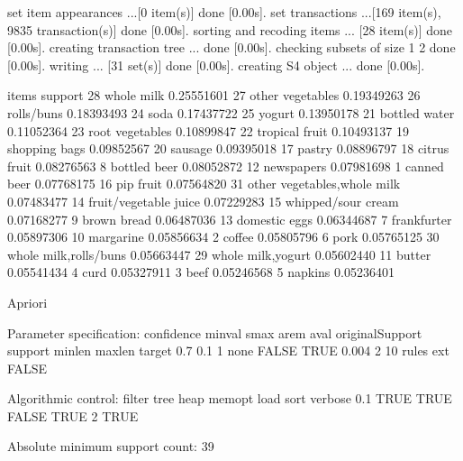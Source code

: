 \documentclass{scrartcl}
\begin{document}
\begin{Schunk}
\begin{Soutput}
set item appearances ...[0 item(s)] done [0.00s].
set transactions ...[169 item(s), 9835 transaction(s)] done [0.00s].
sorting and recoding items ... [28 item(s)] done [0.00s].
creating transaction tree ... done [0.00s].
checking subsets of size 1 2 done [0.00s].
writing ... [31 set(s)] done [0.00s].
creating S4 object  ... done [0.00s].
\end{Soutput}
\begin{Soutput}
   items                         support   
28 {whole milk}                  0.25551601
27 {other vegetables}            0.19349263
26 {rolls/buns}                  0.18393493
24 {soda}                        0.17437722
25 {yogurt}                      0.13950178
21 {bottled water}               0.11052364
23 {root vegetables}             0.10899847
22 {tropical fruit}              0.10493137
19 {shopping bags}               0.09852567
20 {sausage}                     0.09395018
17 {pastry}                      0.08896797
18 {citrus fruit}                0.08276563
8  {bottled beer}                0.08052872
12 {newspapers}                  0.07981698
1  {canned beer}                 0.07768175
16 {pip fruit}                   0.07564820
31 {other vegetables,whole milk} 0.07483477
14 {fruit/vegetable juice}       0.07229283
15 {whipped/sour cream}          0.07168277
9  {brown bread}                 0.06487036
13 {domestic eggs}               0.06344687
7  {frankfurter}                 0.05897306
10 {margarine}                   0.05856634
2  {coffee}                      0.05805796
6  {pork}                        0.05765125
30 {whole milk,rolls/buns}       0.05663447
29 {whole milk,yogurt}           0.05602440
11 {butter}                      0.05541434
4  {curd}                        0.05327911
3  {beef}                        0.05246568
5  {napkins}                     0.05236401
\end{Soutput}
\begin{Soutput}
Apriori

Parameter specification:
 confidence minval smax arem  aval originalSupport support minlen maxlen target
        0.7    0.1    1 none FALSE            TRUE   0.004      2     10  rules
   ext
 FALSE

Algorithmic control:
 filter tree heap memopt load sort verbose
    0.1 TRUE TRUE  FALSE TRUE    2    TRUE

Absolute minimum support count: 39 


\end{Soutput}
\end{Schunk}
\end{document}
